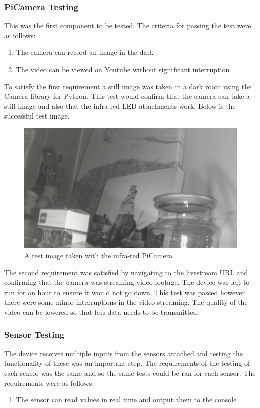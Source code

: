 \documentclass[10pt,a4paper]{article}
\begin{document}
\subsubsection{PiCamera Testing}
This was the first component to be tested. The criteria for passing the test were as follows: 
\begin{enumerate}
  \item The camera can record an image in the dark
  \item The video can be viewed on Youtube without significant interruption
\end{enumerate}

To satisfy the first requirement a still image was taken in a dark room using the Camera library for Python. This test would confirm that the camera can take a still image and also that the infra-red LED attachments work. Below is the successful test image. 

\begin{figure}[H]
  \centering
    \includegraphics[width=\linewidth]{images/testimage.jpg}
    \caption{A test image taken with the infra-red PiCamera}
    \label{fig:cameraTest}
\end{figure}

The second requirement was satisfied by navigating to the livestream URL and confirming that the camera was streaming video footage. The device was left to run for an hour to ensure it would not go down. This test was passed however there were some minor interruptions in the video streaming. The quality of the video can be lowered so that less data needs to be transmitted. 

\subsubsection{Sensor Testing}
The device receives multiple inputs from the sensors attached and testing the functionality of these was an important step. The requirements of the testing of each sensor was the same and so the same tests could be ran for each sensor. The requirements were as follows:
\begin{enumerate}
  \item The sensor can read values in real time and output them to the console
\end{enumerate}
\end{document}
